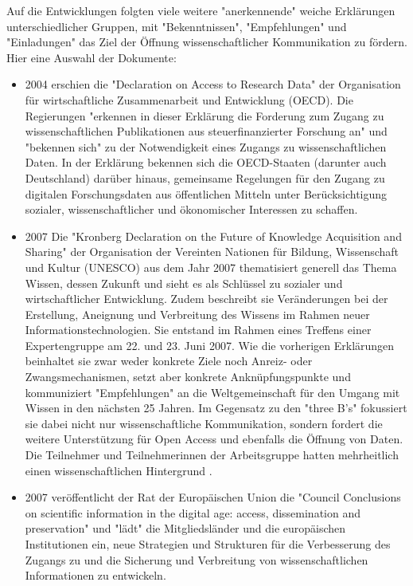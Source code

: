 Auf die Entwicklungen folgten viele weitere "anerkennende" weiche Erklärungen unterschiedlicher Gruppen, mit "Bekenntnissen", "Empfehlungen" und "Einladungen" das Ziel der Öffnung wissenschaftlicher Kommunikation zu fördern. Hier eine Auswahl der Dokumente:
\begin{itemize}
\item 2004 erschien die "Declaration on Access to Research Data" \cite{oecd_2004} der Organisation für wirtschaftliche Zusammenarbeit und Entwicklung (OECD). Die Regierungen "erkennen in dieser Erklärung die Forderung zum Zugang zu wissenschaftlichen Publikationen aus steuerfinanzierter Forschung an" und "bekennen sich" zu der Notwendigkeit eines Zugangs zu wissenschaftlichen Daten. In der Erklärung bekennen sich die OECD-Staaten (darunter auch Deutschland) darüber hinaus, gemeinsame Regelungen für den Zugang zu digitalen Forschungsdaten aus öffentlichen Mitteln unter Berücksichtigung sozialer, wissenschaftlicher und ökonomischer Interessen zu schaffen.
\item 2007 Die "Kronberg Declaration on the Future of Knowledge Acquisition and Sharing" \cite{unesco_2007} der Organisation der Vereinten Nationen für Bildung, Wissenschaft und Kultur (UNESCO) aus dem Jahr 2007 thematisiert generell das Thema Wissen, dessen Zukunft und sieht es als Schlüssel zu sozialer und wirtschaftlicher Entwicklung. Zudem beschreibt sie Veränderungen bei der Erstellung, Aneignung und Verbreitung des Wissens im Rahmen neuer Informationstechnologien. Sie entstand im Rahmen eines Treffens einer Expertengruppe am 22. und 23. Juni 2007. Wie die vorherigen Erklärungen beinhaltet sie zwar weder konkrete Ziele noch Anreiz- oder Zwangsmechanismen, setzt aber konkrete Anknüpfungspunkte und kommuniziert "Empfehlungen" an die Weltgemeinschaft für den Umgang mit Wissen in den nächsten 25 Jahren. Im Gegensatz zu den "three B's" fokussiert sie dabei nicht nur wissenschaftliche Kommunikation, sondern fordert die weitere Unterstützung für Open Access und ebenfalls die Öffnung von Daten. Die Teilnehmer und Teilnehmerinnen der Arbeitsgruppe hatten mehrheitlich einen wissenschaftlichen Hintergrund \cite{unesco_2007_list}.
\item 2007 veröffentlicht der Rat der Europäischen Union die "Council Conclusions on scientific information in the digital age: access, dissemination and preservation" \cite{eu_council_2007} und "lädt" die Mitgliedsländer und die europäischen Institutionen ein, neue Strategien und Strukturen für die Verbesserung des Zugangs zu und die Sicherung und Verbreitung von wissenschaftlichen Informationen zu entwickeln.

\end{itemize}

